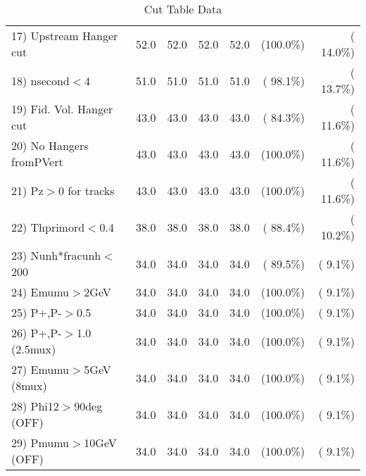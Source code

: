 \begin{table}[h!]
\begin{tabular}{||l||r|r|r|r|r|r||}
 17) Upstream Hanger cut  &         52.0 &         52.0 &         52.0 &         52.0 & (100.0\%) & ( 14.0\%) \\
 18) nsecond$<$4          &         51.0 &         51.0 &         51.0 &         51.0 & ( 98.1\%) & ( 13.7\%) \\
 19) Fid. Vol. Hanger cut &         43.0 &         43.0 &         43.0 &         43.0 & ( 84.3\%) & ( 11.6\%) \\
 20) No Hangers fromPVert &         43.0 &         43.0 &         43.0 &         43.0 & (100.0\%) & ( 11.6\%) \\
 21) Pz$>$0 for tracks    &         43.0 &         43.0 &         43.0 &         43.0 & (100.0\%) & ( 11.6\%) \\
 22) Thprimord$<$0.4      &         38.0 &         38.0 &         38.0 &         38.0 & ( 88.4\%) & ( 10.2\%) \\
 23) Nunh*fracunh$<$200   &         34.0 &         34.0 &         34.0 &         34.0 & ( 89.5\%) & (  9.1\%) \\
 24) Emumu$>$2GeV         &         34.0 &         34.0 &         34.0 &         34.0 & (100.0\%) & (  9.1\%) \\
 25) P+,P-$>$0.5          &         34.0 &         34.0 &         34.0 &         34.0 & (100.0\%) & (  9.1\%) \\
 26) P+,P-$>$1.0 (2.5mux) &         34.0 &         34.0 &         34.0 &         34.0 & (100.0\%) & (  9.1\%) \\
 27) Emumu$>$5GeV  (8mux) &         34.0 &         34.0 &         34.0 &         34.0 & (100.0\%) & (  9.1\%) \\
 28) Phi12$>$90deg  (OFF) &         34.0 &         34.0 &         34.0 &         34.0 & (100.0\%) & (  9.1\%) \\
 29) Pmumu$>$10GeV  (OFF) &         34.0 &         34.0 &         34.0 &         34.0 & (100.0\%) & (  9.1\%) \\
 \hline
 \hline
 \end{tabular}
 \caption{Cut Table  Data     }
 \label{tab-cutcohjpsi-mumu_data}
 \end{table}
